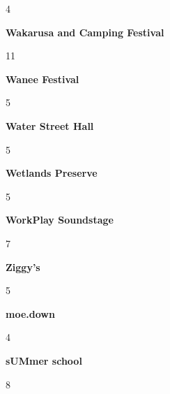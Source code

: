 \begin{center}4\end{center} 
\newline 
\begin{center}\textbf{Wakarusa and Camping Festival}\end{center}
\begin{center}11\end{center} 
\newline 
\begin{center}\textbf{Wanee Festival}\end{center}
\begin{center}5\end{center} 
\newline 
\begin{center}\textbf{Water Street Hall}\end{center}
\begin{center}5\end{center} 
\newline 
\begin{center}\textbf{Wetlands Preserve}\end{center}
\begin{center}5\end{center} 
\newline 
\begin{center}\textbf{WorkPlay Soundstage}\end{center}
\begin{center}7\end{center} 
\newline 
\begin{center}\textbf{Ziggy's}\end{center}
\begin{center}5\end{center} 
\newline 
\begin{center}\textbf{moe.down}\end{center}
\begin{center}4\end{center} 
\newline 
\begin{center}\textbf{sUMmer school}\end{center}
\begin{center}8\end{center} 
\newline 
